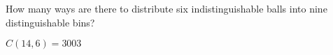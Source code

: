 \documentclass[../main.tex]{subfiles}
\begin{document}
How many ways are there to distribute six indistinguishable balls into nine distinguishable bins?

\solution

$C(14, 6) = 3003$
\end{document}
